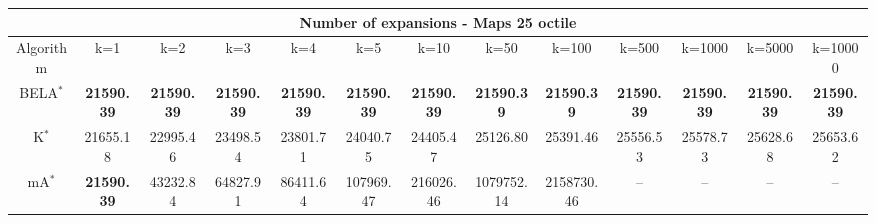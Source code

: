 \begin{tabular}{c|cccccccccccc}\toprule
\multicolumn{13}{c}{Number of expansions - Maps 25 octile}\\ \midrule
Algorithm & k=1 & k=2 & k=3 & k=4 & k=5 & k=10 & k=50 & k=100 & k=500 & k=1000 & k=5000 & k=10000 \\ \midrule
BELA$^*$ & \textbf{21590.39} & \textbf{21590.39} & \textbf{21590.39} & \textbf{21590.39} & \textbf{21590.39} & \textbf{21590.39} & \textbf{21590.39} & \textbf{21590.39} & \textbf{21590.39} & \textbf{21590.39} & \textbf{21590.39} & \textbf{21590.39} \\
K$^*$ & 21655.18 & 22995.46 & 23498.54 & 23801.71 & 24040.75 & 24405.47 & 25126.80 & 25391.46 & 25556.53 & 25578.73 & 25628.68 & 25653.62 \\
mA$^*$ & \textbf{21590.39} & 43232.84 & 64827.91 & 86411.64 & 107969.47 & 216026.46 & 1079752.14 & 2158730.46 & -- & -- & -- & -- \\ \bottomrule 
\end{tabular}
